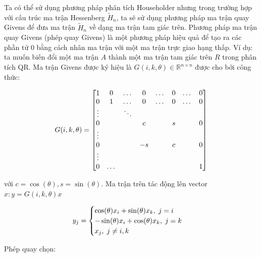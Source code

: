 \documentclass[14pt, a4paper]{article}
\numberwithin{equation}{section}
\numberwithin{algorithm}{section}
\numberwithin{figure}{section}
\numberwithin{dl}{section}
\numberwithin{md}{section}
\numberwithin{bd}{section}
\numberwithin{dn}{section}
\begin{document}
Ta có thể sử dụng phương pháp phân tích Householder nhưng trong trường hợp với cấu trúc ma trận Hessenberg $\widetilde{H}_n$, ta sẽ sử dụng phương pháp ma trận quay Givens để đưa ma trận $\widetilde{H}_n$ về dạng ma trận tam giác trên.
Phương pháp ma trận quay Givens (phép quay Givens) là một phương pháp hiệu quả để tạo ra các phần tử 0 bằng cách nhân ma trận với một ma trận trực giao hạng thấp. Ví dụ: ta muốn biến đổi một ma trận $A$ thành một ma trận tam giác trên $R$ trong phân tích QR.
Ma trận Givens được ký hiệu là $G(i, k, \theta) \in \mathbb{R}^{n \times n}$ được cho bởi công thức:

\begin{equation} \label{eq:Givens-Rotation-Matrix}
    G(i, k, \theta) = \begin{bmatrix} 1 & 0 & \dots & 0 & \dots & 0 & \dots & 0 \\
                                    0 & 1 & \dots & 0 & \dots & 0 & \dots & 0 \\
                                    \vdots & \thickspace & \ddots & \thickspace & \thickspace & \thickspace & \thickspace \\
                                    0 & \thickspace & \space & c & \thickspace & s & \thickspace & 0 \\
                                    \vdots \\
                                    0 & \thickspace & \space & -s & \thickspace & c & \thickspace & 0 \\
                                    \vdots \\
                                    0 & \dots & \thickspace & \thickspace & \thickspace & \thickspace & \space & 1    \end{bmatrix}
\end{equation}

với $c = \cos(\theta), s = \sin(\theta)$. Ma trận trên tác động lên vector $x: y=G(i, k, \theta)x$

\begin{equation} \label{eq:Rotation-Result}
    y_j = \begin{cases}
        \cos(\theta) x_i + \sin(\theta) x_k, \thickspace j = i \\
        -\sin(\theta) x_i + \cos(\theta) x_k, \thickspace j = k \\
        x_j, \thickspace j \neq i, k
    \end{cases}
\end{equation}

Phép quay chọn:
\end{document}
